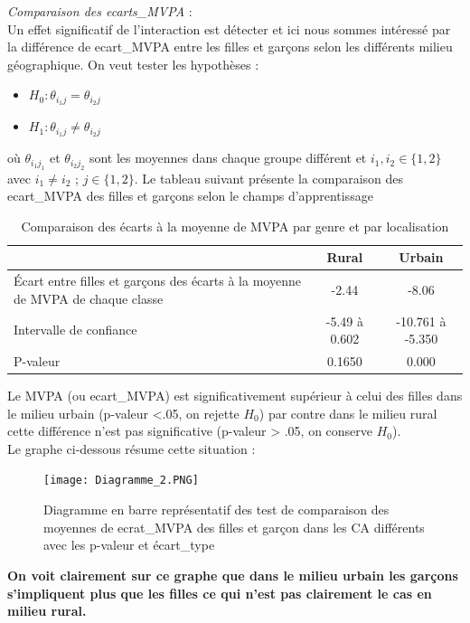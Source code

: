\documentclass[12pt,a4paper]{article}
\begin{document}
	\textit{Comparaison des ecarts\_MVPA} :\\
	Un effet significatif de l'interaction est détecter et ici nous sommes intéressé par la différence de ecart\_MVPA entre les filles et garçons selon les différents milieu géographique. On veut tester les hypothèses : 
	\begin{itemize}
		\item $H_0 : \theta_{i_1j} = \theta_{i_2j}$
		\item $H_1 : \theta_{i_1j} \neq \theta_{i_2j}$
	\end{itemize}
	où $\theta_{i_1j_1}$ et $\theta_{i_2j_2}$ sont les moyennes dans chaque groupe différent et $i_1,i_2\in{\{1, 2\}} $ avec $ i_1 \neq i_2$ ; $j\in{\{1,2\}}$.
	Le tableau suivant présente la comparaison des ecart\_MVPA des filles et garçons selon le champs d'apprentissage
	\begin{table}[H]
		\centering
		\begin{tabular}{|p{5cm}|c|c|}
			\hline
			& Rural & Urbain \\ 
			\hline
			Écart entre filles et garçons des écarts à la moyenne de MVPA de chaque classe & -2.44 & -8.06 \\ 
			\hline
			Intervalle de confiance & -5.49 à 0.602 & -10.761 à -5.350 \\ 
			\hline
			P-valeur & 0.1650 & 0.000 \\ 
			\hline
		\end{tabular}
		\caption{Comparaison des écarts à la moyenne de MVPA par genre et par localisation}
		\label{tab:ecarts_mvpa_genre_localisation}
	\end{table}
	Le MVPA (ou ecart\_MVPA) est significativement supérieur à celui des filles dans le milieu urbain (p-valeur <.05, on rejette $H_0$) par contre dans le milieu rural cette différence n'est pas significative (p-valeur > .05, on conserve $H_0$).\\
	Le graphe ci-dessous résume cette situation :
	\begin{figure}[H]
		\centering
		\texttt{[image: Diagramme\_2.PNG]}
		\caption{Diagramme en barre représentatif des test de comparaison des moyennes de ecrat\_MVPA des filles et garçon dans les CA différents avec les p-valeur et écart\_type}
		\label{fig:Test post hoc}
	\end{figure}
	\textbf{On voit clairement sur ce graphe que dans le milieu urbain les garçons s'impliquent plus que les filles ce qui n'est pas clairement le cas en milieu rural.}
	
\end{document}
